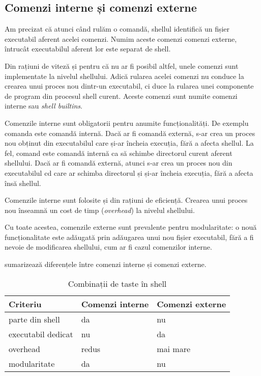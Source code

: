 \subsection{Comenzi interne și comenzi externe}
\label{sec:cli:shell:command-types}

Am precizat că atunci când rulăm o comandă, shellul identifică un fișier executabil aferent acelei comenzi.
Numim aceste comenzi comenzi externe, întrucât executabilul aferent lor este separat de shell.

Din rațiuni de viteză și pentru că nu ar fi posibil altfel, unele comenzi sunt implementate la nivelul shellului.
Adică rularea acelei comenzi nu conduce la crearea unui proces nou dintr-un executabil, ci duce la rularea unei componente de program din procesul shell curent.
Aceste comenzi sunt numite comenzi interne sau \textit{shell builtins}.

Comenzile interne sunt obligatorii pentru anumite funcționalități.
De exemplu comanda  este comandă internă.
Dacă ar fi comandă externă, s-ar crea un proces nou obținut din executabilul  care și-ar încheia execuția, fără a afecta shellul.
La fel, comand  este comandă internă ca să schimbe directorul curent aferent shellului.
Dacă ar fi comandă externă, atunci s-ar crea un proces nou din executabilul cd care ar schimba directorul și și-ar încheia execuția, fără a afecta însă shellul.

Comenzile interne sunt folosite și din rațiuni de eficiență.
Crearea unui proces nou înseamnă un cost de timp (\textit{overhead}) la nivelul shellului.

Cu toate acestea, comenzile externe sunt prevalente pentru modularitate: o nouă funcționalitate este adăugată prin adăugarea unui nou fișier executabil, fără a fi nevoie de modificarea shellului, cum ar fi cazul comenzilor interne.

 sumarizează diferențele între comenzi interne și comenzi externe.

\begin{table}[!htb]
  \begin{center}
    \begin{tabular}{ p{} p{} p{} }
      \toprule
        \textbf{Criteriu} &
        \textbf{Comenzi interne} &
        \textbf{Comenzi externe} \\
      \midrule
        parte din shell &
        da &
        nu \\
      \midrule
        executabil dedicat &
        nu &
        da \\
      \midrule
        overhead &
        redus &
        mai mare \\
      \midrule
        modularitate &
        da &
        nu \\
      \bottomrule
    \end{tabular}
  \end{center}
  \caption{Combinații de taste în shell}
  \label{tab:cli:internal-vs-external}
\end{table}

